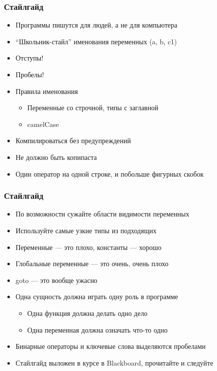 \documentclass{../../slides-style}
\begin{document}
    
    \begin{frame}[plain]
        \titlepage
    \end{frame}
    
    \begin{frame}
        \frametitle{Стайлгайд}
        \begin{itemize}
            \item Программы пишутся для людей, а не для компьютера
            \item ``Школьник-стайл'' именования переменных (a, b, c1)
            \item Отступы!
            \item Пробелы!
            \item Правила именования
            \begin{itemize}
                \item Переменные со строчной, типы с заглавной
                \item camelCase
            \end{itemize}
            \item Компилироваться без предупреждений
            \item Не должно быть копипаста
            \item Один оператор на одной строке, и побольше фигурных скобок
        \end{itemize}
    \end{frame}

    \begin{frame}
        \frametitle{Стайлгайд}
        \begin{itemize}
            \item По возможности сужайте области видимости переменных
            \item Используйте самые узкие типы из подходящих
            \item Переменные --- это плохо, константы --- хорошо
            \item Глобальные переменные --- это очень, очень плохо
            \item goto --- это вообще ужасно
            \item Одна сущность должна играть одну роль в программе
            \begin{itemize}
                \item Одна функция должна делать одно дело
                \item Одна переменная должна означать что-то одно
            \end{itemize}
            \item Бинарные операторы и ключевые слова выделяются пробелами
            \item Стайлгайд выложен в курсе в Blackboard, прочитайте и следуйте
        \end{itemize}
    \end{frame}
\end{document}
